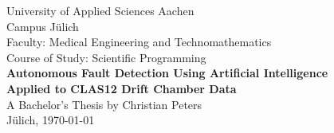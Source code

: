 \begin{titlepage}
  \begin{center}
    \LARGE{University of Applied Sciences Aachen\\}
    \Large{Campus J\"ulich\\}
    \vspace{2cm}
    \Large{Faculty: Medical Engineering and Technomathematics\\}
    \Large{Course of Study: Scientific Programming\\}
    \vspace{3cm}
    \LARGE{\textbf{Autonomous Fault Detection Using Artificial
        Intelligence\\}}
    \LARGE{\textbf{Applied to CLAS12 Drift Chamber Data\\}}
    \vspace{3cm}
    \Large{A Bachelor's Thesis by Christian Peters\\}
    \vspace{2cm}
    \Large{J\"ulich, \today}
  \end{center}
\end{titlepage}
